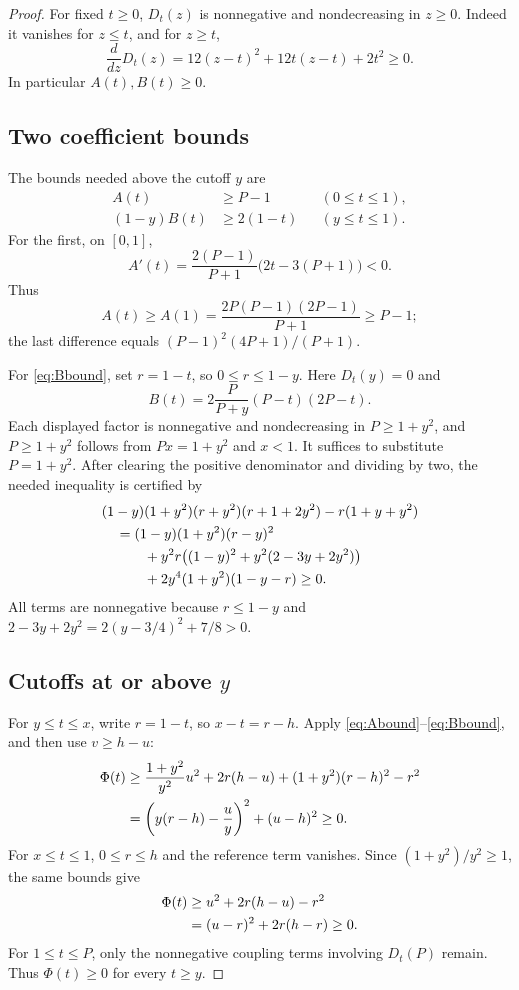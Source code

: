 \documentclass[11pt]{article}
\numberwithin{equation}{section}
\theoremstyle{remark}
\begin{document}
\begin{proof}
For fixed $t\ge0$, $D_t(z)$ is nonnegative and nondecreasing in $z\ge0$. Indeed it vanishes for $z\le t$, and for $z\ge t$,
\[
 \frac{d}{dz}D_t(z)=12(z-t)^2+12t(z-t)+2t^2\ge0.
\]
In particular $A(t),B(t)\ge0$.

\subsection*{Two coefficient bounds}
The bounds needed above the cutoff $y$ are
\begin{align}
 A(t)&\ge P-1 &&(0\le t\le1),\label{eq:Abound}\\
 (1-y)B(t)&\ge2(1-t) &&(y\le t\le1).\label{eq:Bbound}
\end{align}
For the first, on $[0,1]$,
\[
 A'(t)=\frac{2(P-1)}{P+1}\bigl(2t-3(P+1)\bigr)<0.
\]
Thus
\[
 A(t)\ge A(1)=\frac{2P(P-1)(2P-1)}{P+1}\ge P-1;
\]
the last difference equals $(P-1)^2(4P+1)/(P+1)$.

For \eqref{eq:Bbound}, set $r=1-t$, so $0\le r\le1-y$. Here $D_t(y)=0$ and
\[
 B(t)=2\frac{P}{P+y}(P-t)(2P-t).
\]
Each displayed factor is nonnegative and nondecreasing in $P\ge1+y^2$, and $P\ge1+y^2$ follows from $Px=1+y^2$ and $x<1$. It suffices to substitute $P=1+y^2$. After clearing the positive denominator and dividing by two, the needed inequality is certified by
\begin{align}\label{eq:Bcert}
 &(1-y)(1+y^2)(r+y^2)(r+1+2y^2)-r(1+y+y^2)\notag\\
 &\quad=(1-y)(1+y^2)(r-y)^2\notag\\
 &\qquad\quad+y^2r\bigl((1-y)^2+y^2(2-3y+2y^2)\bigr)\notag\\
 &\qquad\quad+2y^4(1+y^2)(1-y-r)\ge0.
\end{align}
All terms are nonnegative because $r\le1-y$ and
$2-3y+2y^2=2(y-3/4)^2+7/8>0$.

\subsection*{Cutoffs at or above $y$}
For $y\le t\le x$, write $r=1-t$, so $x-t=r-h$. Apply \eqref{eq:Abound}--\eqref{eq:Bbound}, and then use $v\ge h-u$:
\begin{align}\label{eq:middlesquares}
 \Phi(t)&\ge\frac{1+y^2}{y^2}u^2+2r(h-u)+(1+y^2)(r-h)^2-r^2\notag\\
 &=\left(y(r-h)-\frac uy\right)^2+(u-h)^2\ge0.
\end{align}
For $x\le t\le1$, $0\le r\le h$ and the reference term vanishes. Since $(1+y^2)/y^2\ge1$, the same bounds give
\begin{align}\label{eq:uppersquare}
 \Phi(t)&\ge u^2+2r(h-u)-r^2\notag\\
 &=(u-r)^2+2r(h-r)\ge0.
\end{align}
For $1\le t\le P$, only the nonnegative coupling terms involving $D_t(P)$ remain. Thus $\Phi(t)\ge0$ for every $t\ge y$.


\end{proof}
\end{document}

